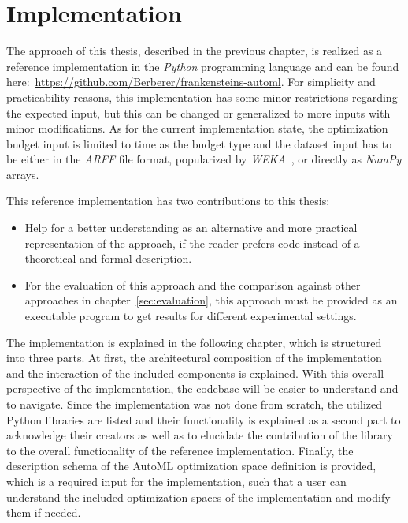 %
\chapter{Implementation}
\label{sec:implementation}
The approach of this thesis, described in the previous chapter, is realized as a reference implementation in the \textit{Python} programming language and can be found here:~\url{https://github.com/Berberer/frankensteins-automl}.\newline
For simplicity and practicability reasons, this implementation has some minor restrictions regarding the expected input, but this can be changed or generalized to more inputs with minor modifications.
As for the current implementation state, the optimization budget input is limited to time as the budget type and the dataset input has to be either in the \textit{ARFF} file format, popularized by \textit{WEKA}~\cite{Witten-Weka}, or directly as \textit{NumPy} arrays.

This reference implementation has two contributions to this thesis:
\begin{itemize}
	\item Help for a better understanding as an alternative and more practical representation of the approach, if the reader prefers code instead of a theoretical and formal description.
	\item For the evaluation of this approach and the comparison against other approaches in chapter~\ref{sec:evaluation}, this approach must be provided as an executable program to get results for different experimental settings.
\end{itemize}

The implementation is explained in the following chapter, which is structured into three parts.
At first, the architectural composition of the implementation and the interaction of the included components is explained.
With this overall perspective of the implementation, the codebase will be easier to understand and to navigate.
Since the implementation was not done from scratch, the utilized Python libraries are listed and their functionality is explained as a second part to acknowledge their creators as well as to elucidate the contribution of the library to the overall functionality of the reference implementation.
Finally, the description schema of the AutoML optimization space definition is provided, which is a required input for the implementation, such that a user can understand the included optimization spaces of the implementation and modify them if needed.

